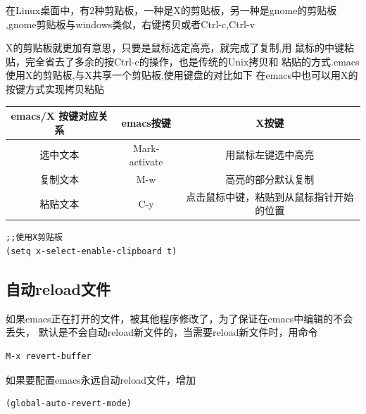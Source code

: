 \documentclass[adobefonts]{ctexart}
\begin{document}
在Linux桌面中，有2种剪贴板，一种是X的剪贴板，另一种是gnome的剪贴板
,gnome剪贴板与windows类似，右键拷贝或者Ctrl-c,Ctrl-v

X的剪贴板就更加有意思，只要是鼠标选定高亮，就完成了复制,用
鼠标的中键粘贴，完全省去了多余的按Ctrl-c的操作，也是传统的Unix拷贝和
粘贴的方式.emacs使用X的剪贴板,与X共享一个剪贴板,使用键盘的对比如下
在emacs中也可以用X的按键方式实现拷贝粘贴
\begin{tabular}{|c||c|c|}
  \hline
  emacs/X 按键对应关系 & emacs按键 & X按键 \\							\hline\hline
  选中文本 & Mark-activate  & 用鼠标左键选中高亮 \\                     \hline
  复制文本 & M-w            & 高亮的部分默认复制 \\                     \hline
  粘贴文本 & C-y            & 点击鼠标中键，粘贴到从鼠标指针开始的位置\\
  \hline
\end{tabular}

\begin{verbatim}
;;使用X剪贴板
(setq x-select-enable-clipboard t)
\end{verbatim}

\subsection{自动reload文件}
如果emacs正在打开的文件，被其他程序修改了，为了保证在emacs中编辑的不会丢失，
默认是不会自动reload新文件的，当需要reload新文件时，用命令
\begin{verbatim}
M-x revert-buffer
\end{verbatim}
如果要配置emacs永远自动reload文件，增加
\begin{verbatim}
(global-auto-revert-mode)
\end{verbatim}
\end{document}
